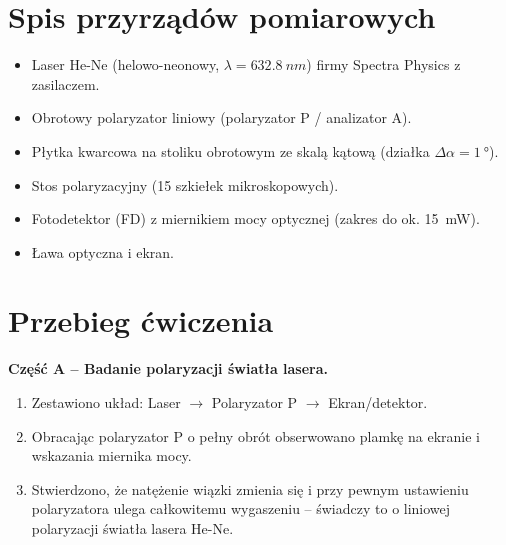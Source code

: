 \documentclass[a4paper,12pt]{article}
\begin{document}
\section*{Spis przyrządów pomiarowych}

\begin{itemize}
  \item Laser He-Ne (helowo-neonowy, $\lambda = \SI{632,8}{nm}$) firmy Spectra Physics z zasilaczem.
  \item Obrotowy polaryzator liniowy (polaryzator P / analizator A).
  \item Płytka kwarcowa na stoliku obrotowym ze skalą kątową (działka $\Delta\alpha = \SI{1}{\degree}$).
  \item Stos polaryzacyjny (15 szkiełek mikroskopowych).
  \item Fotodetektor (FD) z miernikiem mocy optycznej (zakres do ok. \SI{15}{mW}).
  \item Ława optyczna i ekran.
\end{itemize}

\section*{Przebieg ćwiczenia}

\textbf{Część A -- Badanie polaryzacji światła lasera.}
\begin{enumerate}
  \item Zestawiono układ: Laser $\to$ Polaryzator P $\to$ Ekran/detektor.
  \item Obracając polaryzator P o pełny obrót obserwowano plamkę na ekranie i wskazania
  miernika mocy.
  \item Stwierdzono, że natężenie wiązki zmienia się i przy pewnym ustawieniu polaryzatora
  ulega całkowitemu wygaszeniu -- świadczy to o liniowej polaryzacji światła lasera He-Ne.
\end{enumerate}
\end{document}
